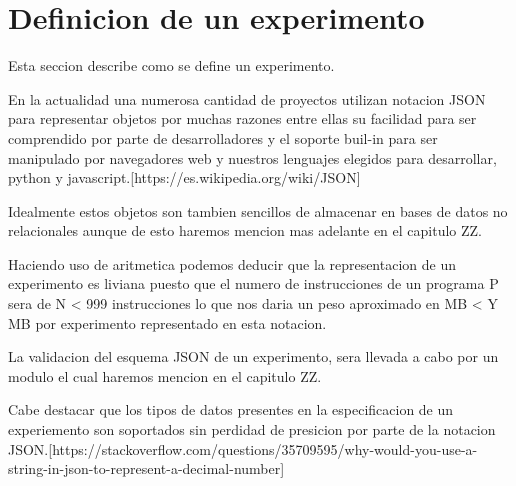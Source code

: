 \section{Definicion de un experimento}

Esta seccion describe como se define un experimento.

En la actualidad una numerosa cantidad de proyectos utilizan notacion JSON para representar
objetos por muchas razones entre ellas su facilidad para ser comprendido por parte de desarrolladores
y el soporte buil-in para ser manipulado por navegadores web y nuestros lenguajes elegidos para
desarrollar, python y javascript.[https://es.wikipedia.org/wiki/JSON]

Idealmente estos objetos son tambien sencillos de almacenar en bases de datos no relacionales
aunque de esto haremos mencion mas adelante en el capitulo ZZ.

Haciendo uso de aritmetica podemos deducir que la representacion de un experimento
es liviana puesto que el numero de instrucciones de un programa P sera de N < 999 instrucciones
lo que nos daria un peso aproximado en MB < Y MB por experimento representado en esta notacion.

La validacion del esquema JSON de un experimento, sera llevada a cabo por un modulo el cual haremos
mencion en el capitulo ZZ. 

Cabe destacar que los tipos de datos presentes en la especificacion de un experiemento son
soportados sin perdidad de presicion por parte de la notacion JSON.[https://stackoverflow.com/questions/35709595/why-would-you-use-a-string-in-json-to-represent-a-decimal-number]

\newpage

